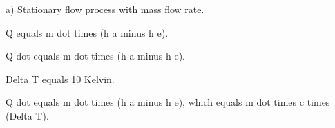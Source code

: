 a) Stationary flow process with mass flow rate.  

Q equals m dot times (h a minus h e).  

Q dot equals m dot times (h a minus h e).  

Delta T equals 10 Kelvin.  

Q dot equals m dot times (h a minus h e), which equals m dot times c times (Delta T).